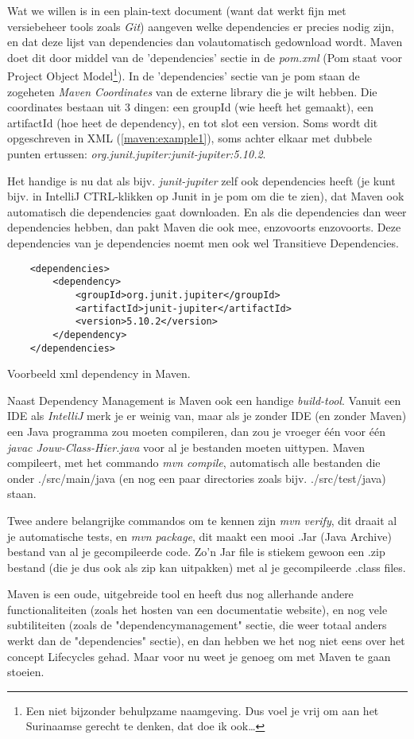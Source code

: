 Wat we willen is in een plain-text document (want dat werkt fijn met versiebeheer tools zoals \textit{Git}) aangeven welke
dependencies er precies nodig zijn, en dat deze lijst van dependencies dan volautomatisch gedownload wordt. Maven doet dit door
middel van de 'dependencies' sectie in de \textit{pom.xml} (Pom staat voor Project Object Model\footnote{
    Een niet bijzonder behulpzame naamgeving. Dus voel je vrij om aan het Surinaamse gerecht te denken, dat doe ik ook\ldots }).
In de 'dependencies' sectie van je pom staan de zogeheten \emph{Maven Coordinates} van de externe library die je wilt hebben.
Die coordinates bestaan uit 3 dingen: een groupId (wie heeft het gemaakt), een artifactId (hoe heet de dependency), 
en tot slot een version. Soms wordt dit opgeschreven in XML (\ref{maven:example1}), soms achter elkaar met dubbele punten ertussen:
\textit{org.junit.jupiter:junit-jupiter:5.10.2}.

Het handige is nu dat als bijv. \textit{junit-jupiter} zelf ook dependencies heeft (je kunt bijv. in IntelliJ CTRL-klikken op Junit in je pom om die te zien), dat
Maven ook automatisch die dependencies gaat downloaden. En als die dependencies dan weer dependencies hebben, dan pakt Maven die ook mee,
enzovoorts enzovoorts. Deze dependencies van je dependencies noemt men ook wel Transitieve Dependencies.

\begin{listing}[H]
    \begin{verbatim}
    <dependencies>
        <dependency>
            <groupId>org.junit.jupiter</groupId>
            <artifactId>junit-jupiter</artifactId>
            <version>5.10.2</version>
        </dependency>
    </dependencies>
    \end{verbatim}
    \caption{Voorbeeld xml dependency in Maven.}
    \label{maven:example1}
\end{listing}

Naast Dependency Management is Maven ook een handige \emph{build-tool}. Vanuit een IDE als \emph{IntelliJ} merk je er weinig
van, maar als je zonder IDE (en zonder Maven) een Java programma zou moeten compileren, dan zou je vroeger 
één voor één \textit{javac Jouw-Class-Hier.java} voor al je bestanden moeten uittypen. 
Maven compileert, met het commando \emph{mvn compile}, automatisch alle bestanden die onder ./src/main/java 
(en nog een paar directories zoals bijv. ./src/test/java) staan.

Twee andere belangrijke commandos om te kennen zijn \emph{mvn verify}, dit draait al je automatische tests, 
en \emph{mvn package}, dit maakt een mooi .Jar (Java Archive) bestand van al je gecompileerde code. Zo'n Jar file is 
stiekem gewoon een .zip bestand (die je dus ook als zip kan uitpakken) met al je gecompileerde .class files.

Maven is een oude, uitgebreide tool en heeft dus nog allerhande andere functionaliteiten (zoals het hosten van een documentatie website), 
en nog vele subtiliteiten (zoals de "dependencymanagement" sectie, die weer totaal anders werkt dan de "dependencies" sectie), en dan
hebben we het nog niet eens over het concept Lifecycles gehad. Maar voor nu weet je genoeg om met Maven te gaan stoeien.